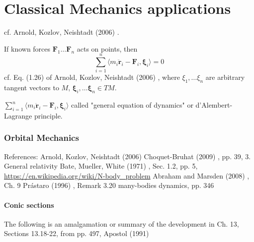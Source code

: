 \part{Classical Mechanics applications}


cf. Arnold, Kozlov, Neishtadt (2006) \cite{dgdt:AKN2006}. 

If known forces $\mathbf{F}_1 \dots \mathbf{F}_n$ acts on points, then 
\begin{equation}
\sum_{i=1}^n \langle m_i \ddot{ \mathbf{r}}_i - \mathbf{F}_i , \mathbf{\xi}_i \rangle = 0
\end{equation}
cf. Eq. (1.26) of Arnold, Kozlov, Neishtadt (2006) \cite{dgdt:AKN2006}, where $\xi_1 , \dots \xi_n$ are arbitrary tangent vectors to $M$, $\mathbf{\xi}_i, \dots \mathbf{\xi}_n \in TM$.  

$\sum_{i=1}^n \langle m_i \ddot{ \mathbf{r}}_i - \mathbf{F}_i , \mathbf{\xi}_i \rangle$ called "general equation of dynamics" or d'Alembert-Lagrange principle.  

\section{Orbital Mechanics}

References:
Arnold, Kozlov, Neishtadt (2006) \cite{dgdt:AKN2006}
Choquet-Bruhat (2009) \cite{dgdt:YChoquet-Bruhat2009}, pp. 39, 3. General relativity
Bate, Mueller, White (1971) \cite{dgdt:BMW1971}, Sec. 1.2, pp. 5, \url{https://en.wikipedia.org/wiki/N-body_problem}
Abraham and Marsden (2008) \cite{dgdt:AbMa2008}, Ch. 9
Pr\'{a}staro (1996) \cite{dgdt:Pras1996}, Remark 3.20 many-bodies dynamics, pp. 346


\subsection{Conic sections}

The following is an amalgamation or summary of the development in Ch. 13, Sections 13.18-22, from pp. 497, Apostol (1991) \cite{dgdt:Apos1991}

